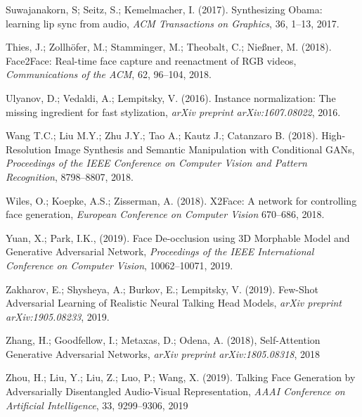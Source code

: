 \documentclass[11pt,a4paper]{article}
\begin{document}
\begin{thebibliography}{11}
 Suwajanakorn, S; Seitz, S.; Kemelmacher, I. (2017).
 Synthesizing Obama: learning lip sync from audio,
 \emph{ACM Transactions on Graphics},
 36, 1--13, 2017.

 Thies, J.; Zollhöfer, M.; Stamminger, M.; Theobalt, C.; Nießner, M. (2018).
 Face2Face: Real-time face capture and reenactment of RGB videos,
 \emph{Communications of the ACM},
 62, 96--104, 2018.


 Ulyanov, D.; Vedaldi, A.; Lempitsky, V. (2016).
 Instance normalization: The missing ingredient for fast stylization,
 \emph{arXiv preprint arXiv:1607.08022},
 2016.
 
 Wang T.C.; Liu M.Y.; Zhu J.Y.; Tao A.; Kautz J.; Catanzaro B. (2018).
 High-Resolution Image Synthesis and Semantic Manipulation with Conditional GANs,
 \emph{Proceedings of the IEEE Conference on Computer Vision and Pattern Recognition},
 8798--8807, 2018.
 
 Wiles, O.; Koepke, A.S.; Zisserman, A. (2018).
 X2Face: A network for controlling face generation,
 \emph{European Conference on Computer Vision}
 670--686, 2018.
 
 Yuan, X.; Park, I.K., (2019).
 Face De-occlusion using 3D Morphable Model and Generative Adversarial Network,
 \emph{Proceedings of the IEEE International Conference on Computer Vision},
 10062--10071, 2019.

 Zakharov, E.; Shysheya, A.; Burkov, E.; Lempitsky, V. (2019).
 Few-Shot Adversarial Learning of Realistic Neural Talking Head Models,
 \emph{arXiv preprint arXiv:1905.08233},
 2019.
 
 Zhang, H.; Goodfellow, I.; Metaxas, D.; Odena, A. (2018),
 Self-Attention Generative Adversarial Networks,
 \emph{arXiv preprint arXiv:1805.08318},
 2018
 
 Zhou, H.; Liu, Y.; Liu, Z.; Luo, P.; Wang, X. (2019).
 Talking Face Generation by Adversarially Disentangled Audio-Visual Representation,
 \emph{AAAI Conference on Artificial Intelligence},
 33, 9299--9306, 2019


\end{thebibliography}
\end{document}
